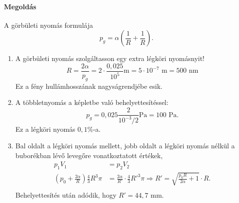 \documentclass[12pt,a4paper]{scrartcl}
\begin{document}
\paragraph{Megoldás}
A görbületi nyomás formulája
\[{p_g} = \alpha \left( {\frac{1}{R} + \frac{1}{R}} \right).\]
\begin{enumerate}
\item A görbületi nyomás szolgáltasson egy extra légköri nyomásnyit!
\[R = \frac{{2\alpha }}{p_g} = 2 \cdot \frac{{0{,}025}}{{{{10}^5}}}{\text{m}} = 5 \cdot {10^{ - 7}}{\text{ m}} = 500{\text{ nm}}\]
Ez a fény hullámhosszának nagyságrendjébe esik.
\item A többletnyomás a képletbe való behelyettesítéssel:
\[{p_g} = 0{,}025\frac{2}{{{{10}^{ - 3}}/2}}{\text{Pa}} = 100{\text{ Pa}}.\]
Ez a légköri nyomás $0{,}1\%$-a.
\item Bal oldalt a légköri nyomás mellett, jobb oldalt a légköri nyomás nélkül a buborékban lévő levegőre vonatkoztatott értékek, 
\[\begin{aligned}
  {p_1}{V_1} &  = {p_2}{V_2} \\ 
  \left( {{p_0} + \frac{{2\alpha }}{R}} \right)\frac{4}{3}{R^3}\pi  &  = \frac{{2\alpha }}{{R'}} \cdot \frac{4}{3}R{'^3}\pi  \Rightarrow R' = \sqrt {\frac{{{p_0}R}}{{2\alpha }} + 1}  \cdot R. \\ 
\end{aligned} \]
Behelyettesítés után adódik, hogy $R' = 44{,}7{\text{ mm}}$.
\end{enumerate}
\normalsize
\end{document}
